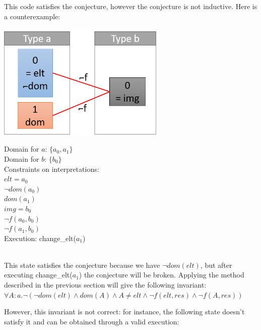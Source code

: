 \documentclass[11pt,a4paper,oldfontcommands,openany]{memoir}
\begin{document}
    This code satisfies the conjecture, however the conjecture is not inductive. Here is a counterexample:\\

    \begin{minipage}{0.45\textwidth}
        \includegraphics[width=8cm]{NonMonotonicExCounterexample}
    \end{minipage} \hfill
    \begin{minipage}{0.45\textwidth}
        Domain for \(a\): \(\{a_0,a_1\}\)\\
        Domain for \(b\): \(\{b_0\}\)\\
        Constraints on interpretations:\\
        \(elt = a_0\)\\
        \(\neg dom(a_0)\)\\
        \(dom(a_1)\)\\
        \(img = b_0\)\\
        \(\neg f(a_0,b_0)\)\\
        \(\neg f(a_1,b_0)\)\\
        Execution: change_elt(\(a_1\))
    \end{minipage}\\

    This state satisfies the conjecture because we have \(\neg dom(elt)\), but after executing change_elt(\(a_1\)) the conjecture will be broken.
    Applying the method described in the previous section will give the following invariant:
    \(\forall A:a. \neg(\neg dom(elt) \land dom(A) \land A \neq elt \land \neg f(elt,res) \land \neg f(A,res))\)

    However, this invariant is not correct: for instance, the following state doesn't satisfy it and can be obtained through a valid execution:
\end{document}
